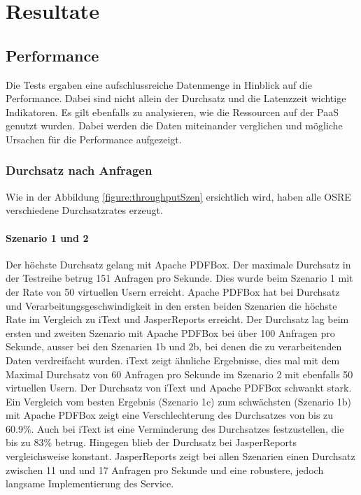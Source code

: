 \documentclass[main.tex]{subfiles}
\begin{document}
\chapter{Resultate} 

\section{Performance}
Die Tests ergaben eine aufschlussreiche Datenmenge in Hinblick auf die Performance. Dabei sind nicht allein der Durchsatz und die Latenzzeit wichtige Indikatoren. Es gilt ebenfalls zu analysieren, wie die Ressourcen auf der PaaS genutzt wurden. Dabei werden die Daten miteinander verglichen und mögliche Ursachen für die Performance aufgezeigt. 



\subsection{Durchsatz nach Anfragen}
Wie in der Abbildung \ref{figure:throughputSzen} ersichtlich wird, haben alle OSRE verschiedene Durchsatzrates erzeugt.

\subsubsection{Szenario 1 und 2}
Der höchste Durchsatz gelang mit Apache PDFBox. Der maximale Durchsatz in der Testreihe betrug 151 Anfragen pro Sekunde. Dies wurde beim Szenario 1 mit der Rate von 50 virtuellen Usern erreicht.  Apache PDFBox hat bei Durchsatz und Verarbeitungsgeschwindigkeit in den ersten beiden Szenarien die höchste Rate im Vergleich zu iText und JasperReports erreicht. 
Der Durchsatz lag beim ersten und zweiten Szenario mit Apache PDFBox bei über 100 Anfragen pro Sekunde, ausser bei den Szenarien 1b und 2b, bei denen die zu verarbeitenden Daten verdreifacht wurden. 
iText zeigt ähnliche Ergebnisse, dies mal mit dem Maximal Durchsatz von 60 Anfragen pro Sekunde im Szenario 2 mit ebenfalls 50 virtuellen Usern. Der Durchsatz von iText und Apache PDFBox schwankt stark. Ein Vergleich vom besten Ergebnis (Szenario 1c) zum schwächsten (Szenario 1b) mit Apache PDFBox zeigt eine Verschlechterung des Durchsatzes von bis zu 60.9\%. Auch bei iText ist eine Verminderung des Durchsatzes festzustellen, die  bis zu 83\% betrug. Hingegen blieb der Durchsatz bei JasperReports vergleichsweise konstant. JasperReports zeigt bei allen Szenarien einen Durchsatz zwischen 11 und und 17 Anfragen pro Sekunde und eine robustere, jedoch langsame Implementierung des Service.\newline 
\end{document}
